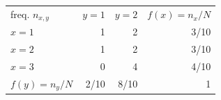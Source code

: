 \documentclass[a4paper,12pt]{article}
\begin{document}
	
		\begin{table}[H]
        \centering
\label{tab:timeline}

		\begin{tabular}{lrrr}
\cmidrule(r){1-4}
freq. $n_{x,y}$ &$y=1$ &$y=2$ &$f(x)=n_{x}/N$ \\
\cmidrule(r){1-4}
$x=1$ &1 &2 &3/10  \\
$x=2$ &1 &2 &3/10 \\
$x=3$ &0 &4 &4/10 \\
$f(y)=n_{y}/N$ &2/10 &8/10 &1 \\
\cmidrule(r){1-4}
\end{tabular}

	\end{table}


\end{document}

